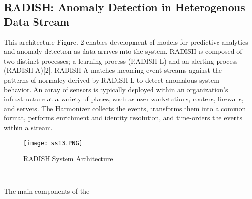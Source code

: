 \documentclass[10pt,a4paper,journal]{IEEEtran}
\begin{document}
\subsection{RADISH: Anomaly Detection in Heterogenous Data
Stream}
\par This architecture Figure. 2 enables development of models for predictive analytics and anomaly detection as data arrives into the system. RADISH is composed of two distinct processes; a learning process (RADISH-L) and an alerting process (RADISH-A)[2]. RADISH-A matches incoming event
streams against the patterns of normalcy derived by RADISH-L
to detect anomalous system behavior. An array of sensors is typically deployed within an organization's infrastructure at a variety of places, such as user workstations, routers, firewalls, and servers. The Harmonizer collects the events, transforms them into a common format, performs enrichment and identity resolution, and time-orders the events within a stream.

\begin{figure}[htbp]
	\centering
	\texttt{[image: ss13.PNG]}
	\caption[Cloud Authenticating Mobile  ]{RADISH System Architecture \cite{2}}
\label{Fig 2}
\end{figure}
\\
\par The main components of the 
\end{document}
